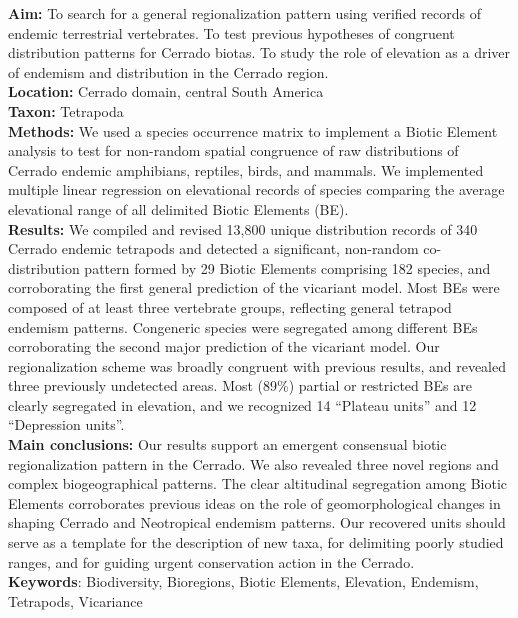 \documentclass[12pt,openright,oneside,a4paper,english]{abntex2}
\begin{document}
\begin{resumo}
		\noindent
		\textbf{Aim:} To search for a general regionalization pattern using verified records of endemic terrestrial vertebrates. To test previous hypotheses of congruent distribution patterns for Cerrado biotas. To study the role of elevation as a driver of endemism and distribution in the Cerrado region.\\
		\noindent
		\textbf{Location:} Cerrado domain, central South America\\
		\noindent
		\textbf{Taxon:} Tetrapoda\\
		\noindent
		\textbf{Methods:} We used a species occurrence matrix to implement a Biotic Element analysis to test for non-random spatial congruence of raw distributions of Cerrado endemic amphibians, reptiles, birds, and mammals. We implemented multiple linear regression on elevational records of species comparing the average elevational range of all delimited Biotic Elements (BE).\\
		\noindent
		\textbf{Results:} We compiled and revised 13,800 unique distribution records of 340 Cerrado endemic tetrapods and detected a significant, non-random co-distribution pattern formed by 29 Biotic Elements comprising 182 species, and corroborating the first general prediction of the vicariant model. Most BEs were composed of at least three vertebrate groups, reflecting general tetrapod endemism patterns. Congeneric species were segregated among different BEs corroborating the second major prediction of the vicariant model. Our regionalization scheme was broadly congruent with previous results, and revealed three previously undetected areas. Most (89\%) partial or restricted BEs are clearly segregated in elevation, and we recognized 14 “Plateau units” and 12 “Depression units”.\\
		\noindent
		\textbf{Main conclusions:} Our results support an emergent consensual biotic regionalization pattern in the Cerrado. We also revealed three novel regions and complex biogeographical patterns. The clear altitudinal segregation among Biotic Elements corroborates previous ideas on the role of geomorphological changes in shaping Cerrado and Neotropical endemism patterns. Our recovered units should serve as a template for the description of new taxa, for delimiting poorly studied ranges, and for guiding urgent conservation action in the Cerrado.\\
		
		\vspace{\medskipamount}
		\noindent
		\textbf{Keywords}: Biodiversity, Bioregions, Biotic Elements, Elevation, Endemism, Tetrapods, Vicariance
\end{resumo}
\end{document}
